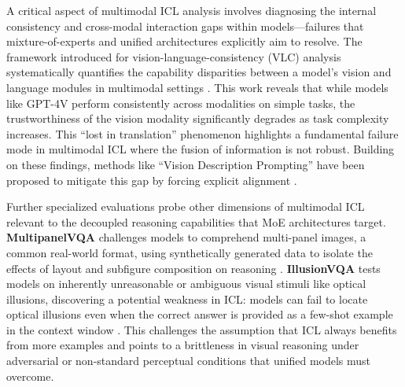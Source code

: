 \documentclass[11pt]{article}
\begin{document}
A critical aspect of multimodal ICL analysis involves diagnosing the internal consistency and cross-modal interaction gaps within models---failures that mixture-of-experts and unified architectures explicitly aim to resolve. The framework introduced for vision-language-consistency (VLC) analysis systematically quantifies the capability disparities between a model's vision and language modules in multimodal settings \cite{ref244}. This work reveals that while models like GPT-4V perform consistently across modalities on simple tasks, the trustworthiness of the vision modality significantly degrades as task complexity increases. This ``lost in translation'' phenomenon highlights a fundamental failure mode in multimodal ICL where the fusion of information is not robust. Building on these findings, methods like ``Vision Description Prompting'' have been proposed to mitigate this gap by forcing explicit alignment \cite{ref244}.

Further specialized evaluations probe other dimensions of multimodal ICL relevant to the decoupled reasoning capabilities that MoE architectures target. \textbf{MultipanelVQA} challenges models to comprehend multi-panel images, a common real-world format, using synthetically generated data to isolate the effects of layout and subfigure composition on reasoning \cite{ref302}. \textbf{IllusionVQA} tests models on inherently unreasonable or ambiguous visual stimuli like optical illusions, discovering a potential weakness in ICL: models can fail to locate optical illusions even when the correct answer is provided as a few-shot example in the context window \cite{ref303}. This challenges the assumption that ICL always benefits from more examples and points to a brittleness in visual reasoning under adversarial or non-standard perceptual conditions that unified models must overcome.
\end{document}
